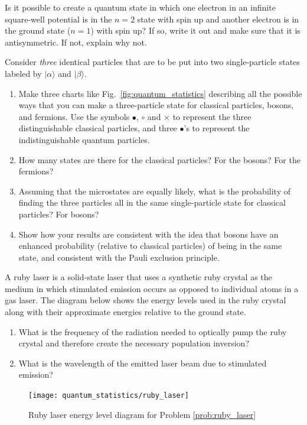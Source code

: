 \begin{problem}
  Is it possible to create a quantum state in which one electron in an
  infinite square-well potential is in
  the $n=2$ state with spin up and another
  electron is in the ground state ($n=1$) with
  spin up?  If so, write it out and make sure that it is
  antisymmetric.  If not, explain why not.
\end{problem}


\begin{problem}
  Consider \textit{three} identical particles that are to be put into
  two single-particle states labeled by $|\alpha\rangle$ and
  $|\beta\rangle$.
  \begin{enumerate}
  \item Make three charts like Fig.~\ref{fig:quantum_statistics}
    describing all the possible ways that you can make a
    three-particle state for classical particles, bosons, and
    fermions.  Use the symbols $\bullet$, $\circ$ and $\times$ to
    represent the three distinguishable classical particles, and three
    $\bullet$'s to represent the indistinguishable quantum particles.
  \item How many states are there for the classical particles?  For
    the bosons?  For the fermions?
  \item Assuming that the microstates are equally likely, what is the
    probability of finding the three particles all in the same
    single-particle state for classical particles?  For bosons?
  \item Show how your results are consistent with the idea that bosons have an
    enhanced probability (relative to classical particles) of being in
    the same state, and consistent with the Pauli exclusion principle.
  \end{enumerate}
\end{problem}


\begin{problem}
\label{prob:ruby_laser}
A ruby laser is a solid-state laser that uses a synthetic ruby crystal
as the medium in which stimulated emission occurs as opposed to
individual atoms in a gas laser.  The diagram below shows the energy
levels used in the ruby crystal along with their approximate energies
relative to the ground state.
\begin{enumerate}
\item What is the frequency of the radiation needed to optically pump
  the ruby crystal and therefore create the necessary population
  inversion?
\item What is the wavelength of the emitted laser beam due to
  stimulated emission?
\end{enumerate}

\begin{figure}[h]
\begin{center}
\texttt{[image: quantum\_statistics/ruby\_laser]}
\caption{Ruby laser energy level diagram for Problem \ref{prob:ruby_laser}}
\label{fig:ruby_laser}
\end{center}
\end{figure}

\end{problem}


